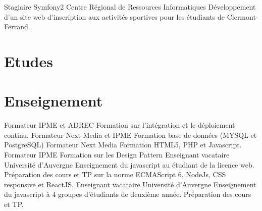 \documentclass[11pt,a4paper]{moderncv}
\begin{document}
        {Stagiaire Symfony2}
        {Centre Régional de Ressources Informatiques}
        {}
        {}
        {
          Développement d'un site web d'inscription aux activités sportives pour les étudiants \newline{}
          de Clermont-Ferrand. 
        }

    \section{Etudes}

    \section{Enseignement}
        {Formateur}
        {IPME et ADREC}
        {}
        {}
        {
          Formation sur l'intégration et le déploiement continu.
        }
        {Formateur}
        {Next Media et IPME}
        {}
        {}
        {
          Formation base de données (MYSQL et PostgreSQL)
        }
        {Formateur}
        {Next Media}
        {}
        {}
        {
          Formation HTML5, PHP et Javascript.
        }
        {Formateur}
        {IPME}
        {}
        {}
        {
            Formation sur les Design Pattern
        }
        {Enseignant vacataire}
        {Université d'Auvergne}
        {}
        {}
        {
          Enseignement du javascript au étudiant de la licence web.\newline{}
          Préparation des cours et TP sur la norme ECMAScript 6, NodeJs, CSS
          responsive et ReactJS.
        }
        {Enseignant vacataire}
        {Université d'Auvergne}
        {}
        {}
        {
          Enseignement du javascript à 4 groupes d'étudiants de deuxième année.\newline{}
          Préparation des cours et TP.
        }
\pagebreak
\end{document}

